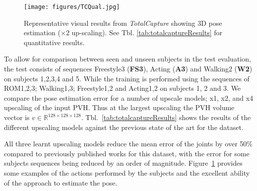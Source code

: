 \documentclass[runningheads]{llncs}
\begin{document}
\begin{figure}[htb]
\centering
\texttt{[image: figures/TCQual.jpg]}
\caption{Representative visual results from {\em TotalCapture} showing 3D pose estimation ($\times 2$ up-scaling). See Tbl. \ref{tab:totalcaptureResults} for quantitative results.}
\label{fig:TCexampleSkels}
\end{figure}To allow for comparison between seen and unseen subjects in the test evaluation, the test consists of sequences Freestyle3 (\textbf{FS3}), Acting (\textbf{A3}) and Walking2 (\textbf{W2}) on subjects 1,2,3,4 and 5. While the training is performed using the sequences of ROM1,2,3; Walking1,3; Freestyle1,2 and Acting1,2  on subjects 1, 2 and 3. We compare the pose estimation error for a number of upscale models; x1, x2, and x4 upscaling of the input PVH. Thus at the largest upscaling the PVH volume vector is $v \in  \mathbb{R}^{128 \times 128 \times 128}$. Tbl.~\ref{tab:totalcaptureResults} shows the results of the different upscaling models against the previous state of the art for the dataset.

All three learnt upscaling models reduce the mean error of the joints by over 50\% compared to previously published works for this dataset, with the error for some subjects sequences being reduced by an order of magnitude. Figure~\ref{fig:TCexampleSkels} provides some examples of the actions performed by the subjects and the excellent ability of the approach to estimate the pose.
\end{document}
